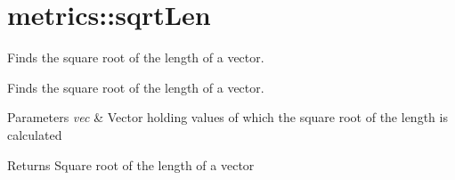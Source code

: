 \hypertarget{group__sqrtLen}{}\section{metrics\+:\+:sqrt\+Len}
\label{group__sqrtLen}


Finds the square root of the length of a vector.  


Finds the square root of the length of a vector. 


\begin{DoxyParams}{Parameters}
{\em vec} & Vector holding values of which the square root of the length is calculated \\
\hline
\end{DoxyParams}
\begin{DoxyReturn}{Returns}
Square root of the length of a vector 
\end{DoxyReturn}
